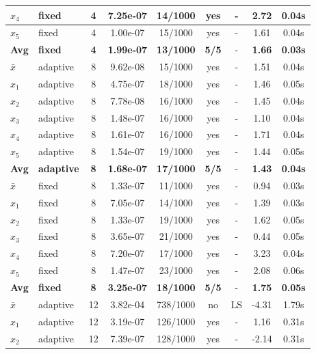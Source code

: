 \begin{longtable}{|l|l|c|c|c|c|c|c|c|}
\hline
$x_4$ & fixed & 4 & 7.25e-07 & 14/1000 & yes & - & 2.72 & 0.04s \\
\hline
$x_5$ & fixed & 4 & 1.00e-07 & 15/1000 & yes & - & 1.61 & 0.04s \\
\hline
\hline\hline
\textbf{Avg} & \textbf{fixed} & \textbf{4} & \textbf{1.99e-07} & \textbf{13/1000} & \textbf{5/5} & - & \textbf{1.66} & \textbf{0.03s} \\
\hline\hline
$\bar{x}$ & adaptive & 8 & 9.62e-08 & 15/1000 & yes & - & 1.51 & 0.04s \\
\hline
$x_1$ & adaptive & 8 & 4.75e-07 & 18/1000 & yes & - & 1.46 & 0.05s \\
\hline
$x_2$ & adaptive & 8 & 7.78e-08 & 16/1000 & yes & - & 1.45 & 0.04s \\
\hline
$x_3$ & adaptive & 8 & 1.48e-07 & 16/1000 & yes & - & 1.10 & 0.04s \\
\hline
$x_4$ & adaptive & 8 & 1.61e-07 & 16/1000 & yes & - & 1.71 & 0.04s \\
\hline
$x_5$ & adaptive & 8 & 1.54e-07 & 19/1000 & yes & - & 1.44 & 0.05s \\
\hline
\hline\hline
\textbf{Avg} & \textbf{adaptive} & \textbf{8} & \textbf{1.68e-07} & \textbf{17/1000} & \textbf{5/5} & - & \textbf{1.43} & \textbf{0.04s} \\
\hline\hline
\hline
$\bar{x}$ & fixed & 8 & 1.33e-07 & 11/1000 & yes & - & 0.94 & 0.03s \\
\hline
$x_1$ & fixed & 8 & 7.05e-07 & 14/1000 & yes & - & 1.39 & 0.03s \\
\hline
$x_2$ & fixed & 8 & 1.33e-07 & 19/1000 & yes & - & 1.62 & 0.05s \\
\hline
$x_3$ & fixed & 8 & 3.65e-07 & 21/1000 & yes & - & 0.44 & 0.05s \\
\hline
$x_4$ & fixed & 8 & 7.20e-07 & 17/1000 & yes & - & 3.23 & 0.04s \\
\hline
$x_5$ & fixed & 8 & 1.47e-07 & 23/1000 & yes & - & 2.08 & 0.06s \\
\hline
\hline\hline
\textbf{Avg} & \textbf{fixed} & \textbf{8} & \textbf{3.25e-07} & \textbf{18/1000} & \textbf{5/5} & - & \textbf{1.75} & \textbf{0.05s} \\
\hline\hline
$\bar{x}$ & adaptive & 12 & 3.82e-04 & 738/1000 & no & LS & -4.31 & 1.79s \\
\hline
$x_1$ & adaptive & 12 & 3.19e-07 & 126/1000 & yes & - & 1.16 & 0.31s \\
\hline
$x_2$ & adaptive & 12 & 7.39e-07 & 128/1000 & yes & - & -2.14 & 0.31s \\

\end{longtable}
